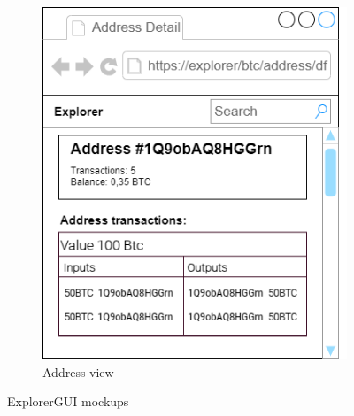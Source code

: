 \begin{figure}[h]
\begin{subfigure}[b]{.4\textwidth}
        \includegraphics[width=1.0\linewidth]{mockups/address.png}
        \caption{Address view}
        \label{addressMockup}
    \end{subfigure}
    \caption{ExplorerGUI mockups}
\end{figure}

